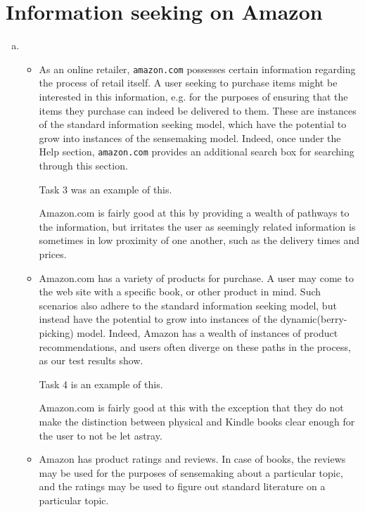
\section{Information seeking on Amazon}

\begin{enumerate}[a.]

\item

\begin{itemize}

\item As an online retailer, \texttt{amazon.com} possesses certain information
regarding the process of retail itself. A user seeking to purchase items might
be interested in this information, e.g. for the purposes of ensuring that the
items they purchase can indeed be delivered to them. These are instances of the
standard information seeking model, which have the potential to grow into
instances of the sensemaking model. Indeed, once under the Help section,
\texttt{amazon.com} provides an additional search box for searching through
this section.

Task 3 was an example of this.

Amazon.com is fairly good at this by providing a wealth of pathways to the
information, but irritates the user as seemingly related information is
sometimes in low proximity of one another, such as the delivery times and
prices.

\item Amazon.com has a variety of products for purchase. A user may come to the
web site with a specific book, or other product in mind. Such scenarios also
adhere to the standard information seeking model, but instead have the
potential to grow into instances of the dynamic(berry-picking) model. Indeed,
Amazon has a wealth of instances of product recommendations, and users often
diverge on these paths in the process, as our test results show.

Task 4 is an example of this.

Amazon.com is fairly good at this with the exception that they do not make the
distinction between physical and Kindle books clear enough for the user to not
be let astray.

\item Amazon has product ratings and reviews. In case of books, the reviews may
be used for the purposes of sensemaking about a particular topic, and the
ratings may be used to figure out standard literature on a particular topic.


\end{itemize}
\end{enumerate}
